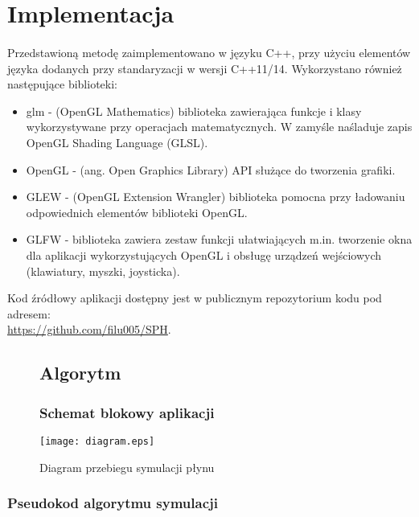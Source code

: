 \newpage

\section{Implementacja}

\paragraph{}
Przedstawioną metodę zaimplementowano w języku C++, przy użyciu elementów języka dodanych przy standaryzacji w wersji C++11/14. Wykorzystano również następujące biblioteki:
\begin{itemize}
	\item glm - (OpenGL Mathematics) biblioteka zawierająca funkcje i klasy wykorzystywane przy operacjach matematycznych. W zamyśle naśladuje zapis OpenGL Shading Language (GLSL).
	\item OpenGL - (ang. Open Graphics Library) API służące do tworzenia grafiki.
	\item GLEW - (OpenGL Extension Wrangler) biblioteka pomocna przy ładowaniu odpowiednich elementów biblioteki OpenGL.
	\item GLFW - biblioteka zawiera zestaw funkcji ułatwiających m.in. tworzenie okna dla aplikacji wykorzystujących OpenGL i obsługę urządzeń wejściowych (klawiatury, myszki, joysticka).
\end{itemize}
Kod źródłowy aplikacji dostępny jest w publicznym repozytorium kodu pod adresem:\\ \href{https://github.com/filu005/SPH}{https://github.com/filu005/SPH}.
\par


\begin{figure}
\subsection{Algorytm}
\subsubsection{Schemat blokowy aplikacji}

\centering
\caption{Diagram przebiegu symulacji płynu}
\texttt{[image: diagram.eps]}%
\label{fig:diagram_main}
\newpage
\end{figure}
\newpage

\subsubsection{Pseudokod algorytmu symulacji}

